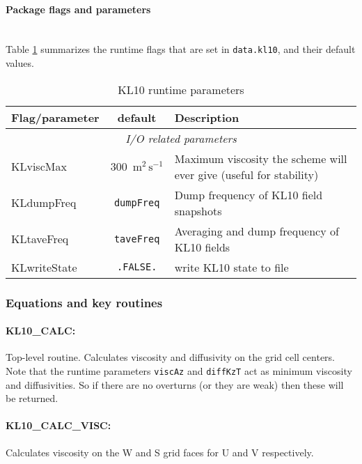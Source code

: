 \paragraph{Package flags and parameters}
~ \\
%
Table \ref{tab:pkg:kl10:runtime_flags} summarizes the
runtime flags that are set in \texttt{data.kl10}, and
their default values.

\begin{table}[!ht]
\centering
  \label{tab:pkg:kl10:runtime_flags}
  {\footnotesize
    \begin{tabular}{|l|c|l|}
      \hline
      \textbf{Flag/parameter} & \textbf{default} &  \textbf{Description}  \\
      \hline \hline
         \multicolumn{3}{|c|}{\textit{I/O related parameters} } \\
         \hline
        KLviscMax & 300\ $\mathrm{m^2\,s^{-1}}$ &
           Maximum viscosity the scheme will ever give (useful for stability) \\
        KLdumpFreq & \texttt{dumpFreq} &
           Dump frequency of KL10 field snapshots \\
        KLtaveFreq & \texttt{taveFreq} &
           Averaging and dump frequency of KL10 fields \\
        KLwriteState & \texttt{.FALSE.} &
           write KL10 state to file \\
             \hline
    \end{tabular}
  }
  \caption{KL10 runtime parameters}
\end{table}

\subsubsection{Equations and key routines
\label{sec:kl10:kpp:equations}}

\paragraph{KL10\_CALC:} Top-level routine.  Calculates viscosity and diffusivity on the grid cell centers.  Note that the runtime parameters \texttt{viscAz} and \texttt{diffKzT} act as minimum viscosity and diffusivities.  So if there are no overturns (or they are weak) then these will be returned.

\paragraph{KL10\_CALC\_VISC:} Calculates viscosity on the W and S grid faces for U and V respectively.

